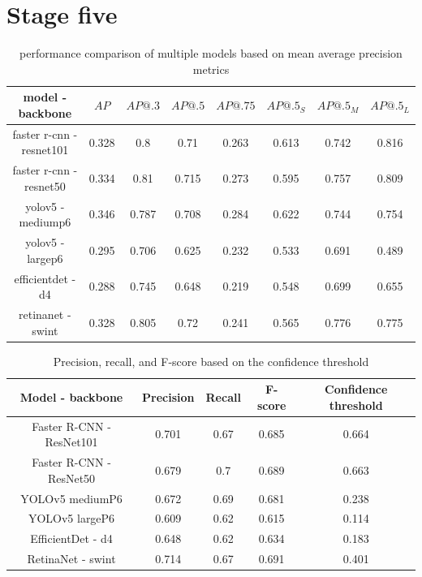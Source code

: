 \section{Stage five}

\begin{table}
    \begin{tabular}{c||c|c|c|c|c|c|c}
        model - backbone         & $AP$  & $AP@.3$ & $AP@.5$ & $AP@.75$ & $AP@.5_S$ & $AP@.5_M$ & $AP@.5_L$ \\ \hline \hline
        faster r-cnn - resnet101 & 0.328 & 0.8     & 0.71    & 0.263    & 0.613     & 0.742     & 0.816     \\ \hline
        faster r-cnn - resnet50  & 0.334 & 0.81    & 0.715   & 0.273    & 0.595     & 0.757     & 0.809     \\ \hline
        yolov5 - mediump6        & 0.346 & 0.787   & 0.708   & 0.284    & 0.622     & 0.744     & 0.754     \\ \hline
        yolov5 - largep6         & 0.295 & 0.706   & 0.625   & 0.232    & 0.533     & 0.691     & 0.489     \\ \hline
        efficientdet - d4        & 0.288 & 0.745   & 0.648   & 0.219    & 0.548     & 0.699     & 0.655     \\ \hline
        retinanet - swint        & 0.328 & 0.805   & 0.72    & 0.241    & 0.565     & 0.776     & 0.775     \\
    \end{tabular}
    \caption{performance comparison of multiple models based on mean average precision metrics}
    \label{tab:model_comparison4k}
\end{table}

\begin{table}
    \begin{tabular}{c||c|c|c|c}
        Model - backbone         & Precision & Recall & F-score & Confidence threshold \\ \hline \hline
        Faster R-CNN - ResNet101 & 0.701     & 0.67   & 0.685   & 0.664                \\ \hline
        Faster R-CNN - ResNet50  & 0.679     & 0.7    & 0.689   & 0.663                \\ \hline
        YOLOv5 mediumP6          & 0.672     & 0.69   & 0.681   & 0.238                \\ \hline
        YOLOv5 largeP6           & 0.609     & 0.62   & 0.615   & 0.114                \\ \hline
        EfficientDet - d4        & 0.648     & 0.62   & 0.634   & 0.183                \\ \hline
        RetinaNet - swint        & 0.714     & 0.67   & 0.691   & 0.401                \\ \hline
    \end{tabular}
    \caption{Precision, recall, and F-score based on the confidence threshold}
    \label{tab:model_prf4k}
\end{table}


